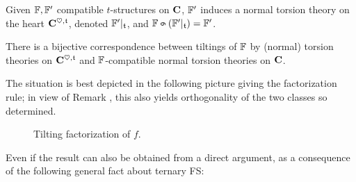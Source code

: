 \begin{proposition}
Given $\mathbb{F}, \mathbb{F}'$ compatible $t$\hyp{}structures on $\mathbf{C}$, $\mathbb{F}'$ induces a normal torsion theory on the heart $\mathbf{C}^{\heartsuit, \mathfrak{t}}$, denoted $\mathbb{F}'|_{\mathfrak{t}}$, and $\fF \tilt (\fF'|_\tee) = \fF'$.
\end{proposition}
\begin{proposition}
There is a bijective correspondence between tiltings of $\mathbb{F}$ by (normal) torsion theories on $\mathbf{C}^{\heartsuit, \mathfrak{t}}$ and $\mathbb{F}$\hyp{}compatible normal torsion theories on $\mathbf{C}$.
\end{proposition}
The situation is best depicted in the following picture giving the factorization rule; in view of Remark , this also yields orthogonality of the two classes so determined.
\begin{figure}[H]
\caption{Tilting factorization of $f$.}
\label{tilting.fac}
\end{figure}
Even if the result can also be obtained from a direct argument, as a consequence of the following general fact about ternary FS:
